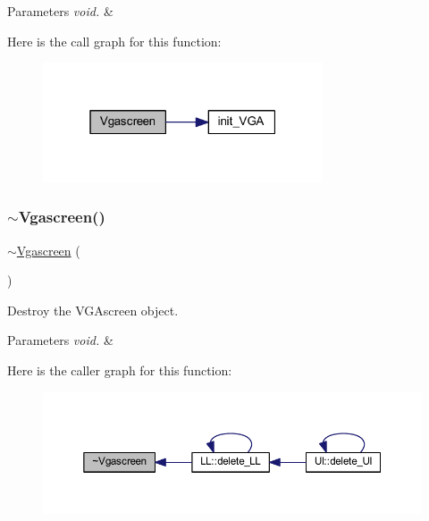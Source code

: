 \begin{DoxyParams}{Parameters}
{\em void.} & \\
\hline
\end{DoxyParams}
Here is the call graph for this function\+:
\nopagebreak
\begin{figure}[H]
\begin{center}
\leavevmode
\includegraphics[width=235pt]{class_vgascreen_ad5914fac8c1af8491b92dfe780490191_cgraph}
\end{center}
\end{figure}
\mbox{\label{class_vgascreen_aac39d059f15042b0d763c6a173540552}} 
\subsubsection{\texorpdfstring{$\sim$\+Vgascreen()}{~Vgascreen()}}
{\footnotesize\ttfamily $\sim$\mbox{\hyperlink{class_vgascreen}{Vgascreen}} (\begin{DoxyParamCaption}\item[{void}]{ }\end{DoxyParamCaption})\hspace{0.3cm}{\ttfamily [virtual]}}



Destroy the V\+G\+Ascreen object. 


\begin{DoxyParams}{Parameters}
{\em void.} & \\
\hline
\end{DoxyParams}
Here is the caller graph for this function\+:
\nopagebreak
\begin{figure}[H]
\begin{center}
\leavevmode
\includegraphics[width=350pt]{class_vgascreen_aac39d059f15042b0d763c6a173540552_icgraph}
\end{center}
\end{figure}


